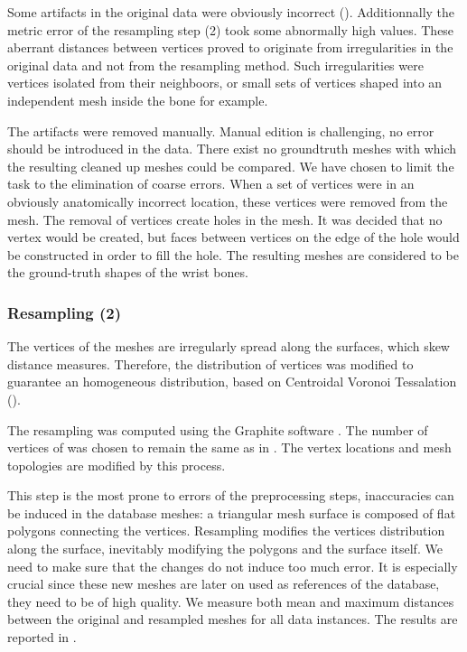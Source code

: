 Some artifacts in the original data were obviously incorrect (). Additionnally the metric error of the resampling step (2) took some abnormally high values. These aberrant distances between vertices proved to originate from irregularities in the original data and not from the resampling method. Such irregularities were vertices isolated from their neighboors, or small sets of vertices shaped into an independent mesh inside the bone for example. 

The artifacts were removed manually. Manual edition is challenging, no error should be introduced in the data. There exist no groundtruth meshes with which the resulting cleaned up meshes could be compared. We have chosen to limit the task to the elimination of coarse errors. When a set of vertices were in an obviously anatomically incorrect location, these vertices were removed from the mesh. The removal of vertices create holes in the mesh. It was decided that no vertex would be created, but faces between vertices on the edge of the hole would be constructed in order to fill the hole. The resulting meshes \mo* are considered to be the ground-truth shapes of the wrist bones.


\subsubsection{Resampling (2)}
\label{ssubsec:resampling_validation}

The vertices of the meshes \mo* are irregularly spread along the surfaces, which skew distance measures. Therefore, the distribution of vertices was modified to guarantee an homogeneous distribution, based on Centroidal Voronoi Tessalation (). 

The resampling was computed using the Graphite software \cite{graphite}. The number of vertices of \md* was chosen to remain the same as in \mo*. The vertex locations and mesh topologies are modified by this process. 

This step is the most prone to errors of the preprocessing steps, inaccuracies can be induced in the database meshes: a triangular mesh surface is composed of flat polygons connecting the vertices. Resampling modifies the vertices distribution along the surface, inevitably modifying the polygons and the surface itself. We need to make sure that the changes do not induce too much error. It is especially crucial since these new meshes are later on used as references of the database, they need to be of high quality. We measure both mean and maximum distances between the original and resampled meshes for all data instances. The results are reported in . %

